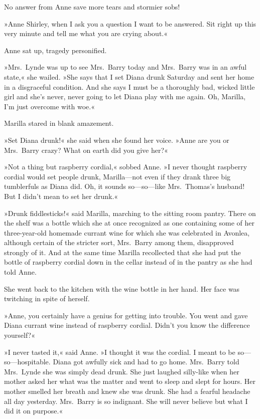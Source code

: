 No answer from Anne save more tears and stormier sobs!

»Anne Shirley, when I ask you a question I want to be answered. Sit right up this very minute and tell me what you are crying about.«

Anne sat up, tragedy personified.

»Mrs.~Lynde was up to see Mrs.~Barry today and Mrs.~Barry was in an awful state,« she wailed. »She says that I set Diana drunk Saturday and sent her home in a disgraceful condition. And she says I must be a thoroughly bad, wicked little girl and she's never, never going to let Diana play with me again. Oh, Marilla, I'm just overcome with woe.«

Marilla stared in blank amazement.

»Set Diana drunk!« she said when she found her voice. »Anne are you or Mrs.~Barry crazy? What on earth did you give her?«

»Not a thing but raspberry cordial,« sobbed Anne. »I never thought raspberry cordial would set people drunk, Marilla—not even if they drank three big tumblerfuls as Diana did. Oh, it sounds so—so—like Mrs.~Thomas's husband! But I didn't mean to set her drunk.«

»Drunk fiddlesticks!« said Marilla, marching to the sitting room pantry. There on the shelf was a bottle which she at once recognized as one containing some of her three-year-old homemade currant wine for which she was celebrated in Avonlea, although certain of the stricter sort, Mrs.~Barry among them, disapproved strongly of it. And at the same time Marilla recollected that she had put the bottle of raspberry cordial down in the cellar instead of in the pantry as she had told Anne.

She went back to the kitchen with the wine bottle in her hand. Her face was twitching in spite of herself.

»Anne, you certainly have a genius for getting into trouble. You went and gave Diana currant wine instead of raspberry cordial. Didn't you know the difference yourself?«

»I never tasted it,« said Anne. »I thought it was the cordial. I meant to be so—so—hospitable. Diana got awfully sick and had to go home. Mrs.~Barry told Mrs.~Lynde she was simply dead drunk. She just laughed silly-like when her mother asked her what was the matter and went to sleep and slept for hours. Her mother smelled her breath and knew she was drunk. She had a fearful headache all day yesterday. Mrs.~Barry is so indignant. She will never believe but what I did it on purpose.«

